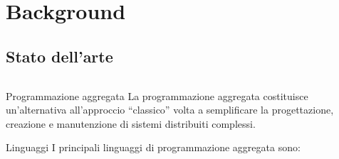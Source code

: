 \section{Background}
    \subsection{Stato dell'arte}

      \begin{frame}{\insertsectionhead}{\insertsubsectionhead}
        \begin{columns}
          \begin{column}{.7\textwidth}
            \begin{block}{Programmazione aggregata}
              La programmazione aggregata costituisce un'alternativa all'approccio ``classico'' volta a semplificare la progettazione, creazione e manutenzione di sistemi distribuiti complessi.
            \end{block}

            \begin{block}{Linguaggi}
              I principali linguaggi di programmazione aggregata sono:


\end{block}
\end{column}
\end{columns}
\end{frame}
